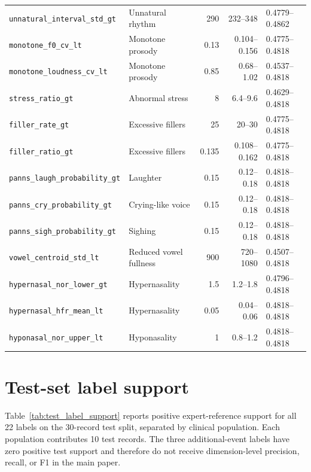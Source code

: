 \documentclass[10pt]{article}
\begin{document}
\begin{longtable}{p{}p{}rrp{}}
\texttt{unnatural\_interval\_std\_gt} & Unnatural rhythm & 290 & 232--348 & 0.4779--0.4862 \\
\texttt{monotone\_f0\_cv\_lt} & Monotone prosody & 0.13 & 0.104--0.156 & 0.4775--0.4818 \\
\texttt{monotone\_loudness\_cv\_lt} & Monotone prosody & 0.85 & 0.68--1.02 & 0.4537--0.4818 \\
\texttt{stress\_ratio\_gt} & Abnormal stress & 8 & 6.4--9.6 & 0.4629--0.4818 \\
\texttt{filler\_rate\_gt} & Excessive fillers & 25 & 20--30 & 0.4775--0.4818 \\
\texttt{filler\_ratio\_gt} & Excessive fillers & 0.135 & 0.108--0.162 & 0.4775--0.4818 \\
\texttt{panns\_laugh\_probability\_gt} & Laughter & 0.15 & 0.12--0.18 & 0.4818--0.4818 \\
\texttt{panns\_cry\_probability\_gt} & Crying-like voice & 0.15 & 0.12--0.18 & 0.4818--0.4818 \\
\texttt{panns\_sigh\_probability\_gt} & Sighing & 0.15 & 0.12--0.18 & 0.4818--0.4818 \\
\texttt{vowel\_centroid\_std\_lt} & Reduced vowel fullness & 900 & 720--1080 & 0.4507--0.4818 \\
\texttt{hypernasal\_nor\_lower\_gt} & Hypernasality & 1.5 & 1.2--1.8 & 0.4796--0.4818 \\
\texttt{hypernasal\_hfr\_mean\_lt} & Hypernasality & 0.05 & 0.04--0.06 & 0.4818--0.4818 \\
\texttt{hyponasal\_nor\_upper\_lt} & Hyponasality & 1 & 0.8--1.2 & 0.4818--0.4818 \\
\bottomrule
\end{longtable}

\section{Test-set label support}
Table~\ref{tab:test_label_support} reports positive expert-reference support for all 22 labels on the 30-record test split, separated by clinical population. Each population contributes 10 test records. The three additional-event labels have zero positive test support and therefore do not receive dimension-level precision, recall, or F1 in the main paper.
\end{document}
